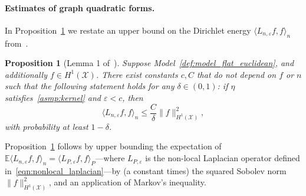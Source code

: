 \documentclass{article}
\newcommand{\1}{\mathbf{1}}
\newcommand{\mc}[1]{\mathcal{#1}}
\newcommand{\Ebb}{\mathbb{E}}
\newcommand{\dotp}[2]{\langle #1, #2 \rangle}
\theoremstyle{alden}
\theoremstyle{aldenthm}
\newtheorem{proposition}{Proposition}
\theoremstyle{definition}
\theoremstyle{remark}
\begin{document}
\paragraph{Estimates of graph quadratic forms.}
In Proposition~\ref{prop:graph_seminorm_fo} we restate an upper bound on the Dirichlet energy $\dotp{L_{n,\varepsilon}f}{f}_n$ from~\cite{green2021}. 
\begin{proposition}[Lemma 1 of~\cite{green2021}]
	\label{prop:graph_seminorm_fo}
	Suppose Model~\ref{def:model_flat_euclidean}, and additionally $f \in H^1(\mc{X})$. There exist constants $c,C$ that do not depend on $f$ or $n$ such that the following statement holds for any $\delta \in (0,1)$: if $\eta$ satisfies~\ref{asmp:kernel} and $\varepsilon < c$, then
	\begin{equation}
	\label{eqn:graph_seminorm_fo}
	\dotp{L_{n,\varepsilon}f}{f}_n \leq \frac{C}{\delta} \|f\|_{H^1(\mc{X})}^2,
	\end{equation}
	with probability at least $1 - \delta$.
\end{proposition}
Proposition~\ref{prop:graph_seminorm_fo} follows by upper bounding the expectation of $\Ebb\dotp{L_{n,\varepsilon}f}{f}_n = \dotp{L_{P,\varepsilon}f}{f}_P$---where $L_{P,\varepsilon}$ is the non-local Laplacian operator defined in~\eqref{eqn:nonlocal_laplacian}---by (a constant times) the squared Sobolev norm $\|f\|_{H^1(\mc{X})}^2$, and an application of Markov's inequality.
\end{document}
